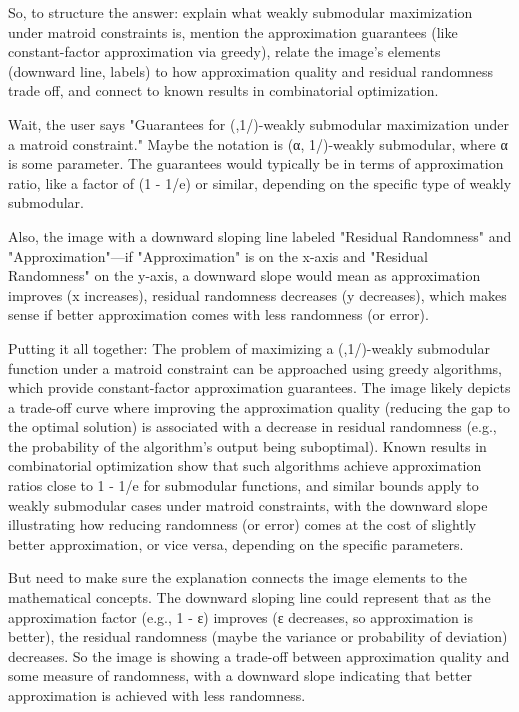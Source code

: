 So, to structure the answer: explain what weakly submodular maximization under matroid constraints is, mention the approximation guarantees (like constant-factor approximation via greedy), relate the image's elements (downward line, labels) to how approximation quality and residual randomness trade off, and connect to known results in combinatorial optimization.

Wait, the user says "Guarantees for (,1/)-weakly submodular maximization under a matroid constraint." Maybe the notation is (α, 1/)-weakly submodular, where α is some parameter. The guarantees would typically be in terms of approximation ratio, like a factor of (1 - 1/e) or similar, depending on the specific type of weakly submodular.

Also, the image with a downward sloping line labeled "Residual Randomness" and "Approximation"—if "Approximation" is on the x-axis and "Residual Randomness" on the y-axis, a downward slope would mean as approximation improves (x increases), residual randomness decreases (y decreases), which makes sense if better approximation comes with less randomness (or error).

Putting it all together: The problem of maximizing a (,1/)-weakly submodular function under a matroid constraint can be approached using greedy algorithms, which provide constant-factor approximation guarantees. The image likely depicts a trade-off curve where improving the approximation quality (reducing the gap to the optimal solution) is associated with a decrease in residual randomness (e.g., the probability of the algorithm's output being suboptimal). Known results in combinatorial optimization show that such algorithms achieve approximation ratios close to 1 - 1/e for submodular functions, and similar bounds apply to weakly submodular cases under matroid constraints, with the downward slope illustrating how reducing randomness (or error) comes at the cost of slightly better approximation, or vice versa, depending on the specific parameters.

But need to make sure the explanation connects the image elements to the mathematical concepts. The downward sloping line could represent that as the approximation factor (e.g., 1 - ε) improves (ε decreases, so approximation is better), the residual randomness (maybe the variance or probability of deviation) decreases. So the image is showing a trade-off between approximation quality and some measure of randomness, with a downward slope indicating that better approximation is achieved with less randomness.

